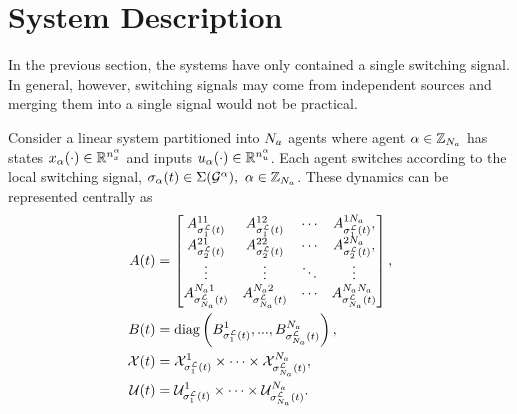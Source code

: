 
\section{System Description}
In the previous section, the systems have only contained a single switching signal. In general, however, switching signals may come from independent sources and merging them into a single signal would not be practical. 

Consider a linear system partitioned into ${N_a}$ agents where agent $\alpha\in\mathbb{Z}_{{N_a}}$ has states $x_{\alpha}(\cdot)\in\mathbb{R}^{n_x^\alpha}$ and inputs $u_{\alpha}(\cdot)\in\mathbb{R}^{n_u^\alpha}$. Each agent switches according to the local switching signal, $\ss_\agentidx(t)\in\Sigma(\graph^\agentidx),\ \agentidx\in\idxset{\numagents}$. These dynamics can be represented centrally as
\begin{subequations}
\label{eq:sys}
\begin{align}
A(t)&=\begin{bmatrix}
A^{11}_{\ssl[1](t)}&A^{12}_{\ssl[1](t)}&\cdots&A^{1\numagents}_{\ssl[1](t)},\\
A^{21}_{\ssl[2](t)}&A^{22}_{\ssl[2](t)}&\cdots&A^{2\numagents}_{\ssl[2](t)},\\
\vdots&\vdots & \ddots & \vdots\\
A^{\numagents 1}_{\ssl[\numagents](t)} & A^{\numagents 2}_{\ssl[\numagents](t)} &\cdots & A^{\numagents \numagents}_{\ssl[\numagents](t)} 
\end{bmatrix},\label{eq:sys_A}\\
B(t)&=\text{diag}\left(
B^{1}_{\ssl[1](t)},...,B^{\numagents}_{\ssl[\numagents](t)}\right),\label{eq:sys_B}\\
\xcon(t)&=\xcon[\ssl[1](t)]^1\times\cdots\times\xcon[\ssl[\numagents](t)]^\numagents,\label{eq:sys_X}\\
\ucon(t)&=\ucon[\ssl[1](t)]^1\times\cdots\times\ucon[\ssl[\numagents](t)]^\numagents\label{eq:sys_Y}.
\end{align}
\end{subequations}

